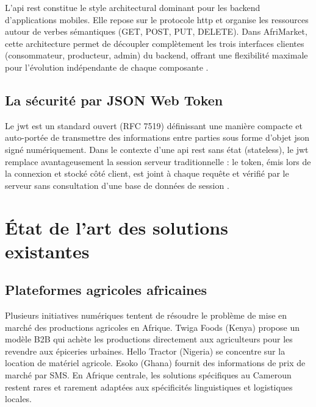 \documentclass[12pt, a4paper, oneside]{report}
\begin{document}
L'\gls{api} \gls{rest} constitue le style architectural dominant pour les backend
d'applications mobiles. Elle repose sur le protocole \gls{http} et organise les ressources
autour de verbes sémantiques (GET, POST, PUT, DELETE). Dans AfriMarket, cette architecture
permet de découpler complètement les trois interfaces clientes (consommateur, producteur,
admin) du backend, offrant une flexibilité maximale pour l'évolution indépendante de
chaque composante \cite{fielding2000}.

\subsection{La sécurité par JSON Web Token}

Le \gls{jwt} est un standard ouvert (RFC 7519) définissant une manière compacte et
auto-portée de transmettre des informations entre parties sous forme d'objet \gls{json}
signé numériquement. Dans le contexte d'une \gls{api} \gls{rest} sans état (stateless),
le \gls{jwt} remplace avantageusement la session serveur traditionnelle : le token, émis
lors de la connexion et stocké côté client, est joint à chaque requête et vérifié par le
serveur sans consultation d'une base de données de session \cite{jones2015}.

\section{État de l'art des solutions existantes}

\subsection{Plateformes agricoles africaines}

Plusieurs initiatives numériques tentent de résoudre le problème de mise en marché des
productions agricoles en Afrique. Twiga Foods (Kenya) propose un modèle B2B qui achète les
productions directement aux agriculteurs pour les revendre aux épiceries urbaines. Hello
Tractor (Nigeria) se concentre sur la location de matériel agricole. Esoko (Ghana) fournit
des informations de prix de marché par SMS. En Afrique centrale, les solutions spécifiques
au Cameroun restent rares et rarement adaptées aux spécificités linguistiques et
logistiques locales.
\end{document}

